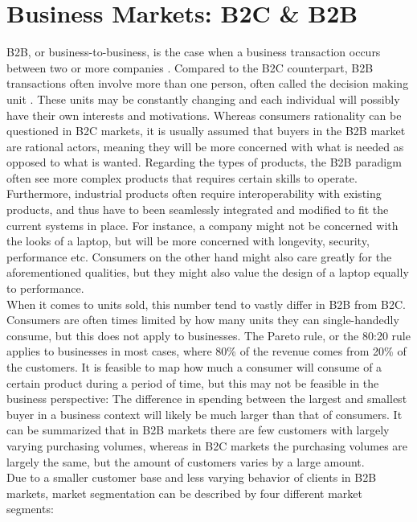 \section{Business Markets: B2C \& B2B}
B2B, or business-to-business, is the case when a business transaction occurs between two or more companies \cite{jewels2001towards}. Compared to the B2C counterpart, B2B transactions often involve more than one person, often called the decision making unit \cite{paulhaguenickhaguematthewharrison}. These units may be constantly changing and each individual will possibly have their own interests and motivations. Whereas consumers rationality can be questioned in B2C markets, it is usually assumed that buyers in the B2B market are rational actors, meaning they will be more concerned with what is needed as opposed to what is wanted. Regarding the types of products, the B2B paradigm often see more complex products that requires certain skills to operate. Furthermore, industrial products often require interoperability with existing products, and thus have to been seamlessly integrated and modified to fit the current systems in place. For instance, a  company might not be concerned with the looks of a laptop, but will be more concerned with longevity, security, performance etc. Consumers on the other hand might also care greatly for the aforementioned qualities, but they might also value the design of a laptop equally to performance. 
\newline
\\
When it comes to units sold, this number tend to vastly differ in B2B from B2C. Consumers are often times limited by how many units they can single-handedly consume, but this does not apply to businesses. The Pareto rule, or the 80:20 rule applies to businesses in most cases, where 80\% of the revenue comes from 20\% of the customers. It is feasible to map how much a consumer will consume of a certain product during a period of time, but this may not be feasible in the business perspective: The difference in spending between the largest and smallest buyer in a business context will likely be much larger than that of consumers. It can be summarized that in B2B markets there are few customers with largely varying purchasing volumes, whereas in B2C markets the purchasing volumes are largely the same, but the amount of customers varies by a large amount.
\newline
\\
Due to a smaller customer base and less varying behavior of clients in B2B markets, market segmentation can be described by four different market segments:
